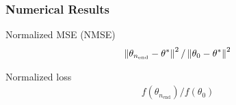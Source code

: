 \begin{frame}
\begin{small}
\frametitle{\centering Numerical Results}
\begin{block}{\alert{Normalized MSE (NMSE)} }
\begin{align}
\left\| \theta_{n_\text{end}} - \theta^* \right\|^2 / \left\| \theta_0 - \theta^*\right\|^2
\end{align}
\end{block}
\begin{block}{ \alert{Normalized loss}}
\begin{align} 
f(\theta_{n_\text{end}})/f(\theta_0)
 \end{align} 
 \end{block}
 \end{small}
\end{frame}


